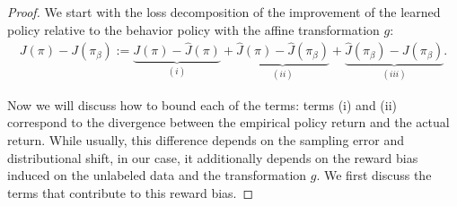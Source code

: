 \begin{proof}
We start with the loss decomposition of the improvement of the learned policy relative to the behavior policy with the affine transformation $g$:  
\begin{align*}
    J(\pi) - J(\pi_\beta) := \underbrace{J(\pi) - \widehat{J}(\pi)}_{(i)} + \underbrace{\widehat{J}(\pi)  - \widehat{J}(\pi_\beta)}_{(ii)} + \underbrace{\widehat{J}(\pi_\beta) - {J}(\pi_\beta)}_{(iii)}.
\end{align*}

Now we will discuss how to bound each of the terms: terms (i) and (ii) correspond to the divergence between the empirical policy return and the actual return. While usually, this difference depends on the sampling error and distributional shift, in our case, it additionally depends on the reward bias induced on the unlabeled data and the transformation $g$. We first discuss the terms that contribute to this reward bias.


\end{proof}
